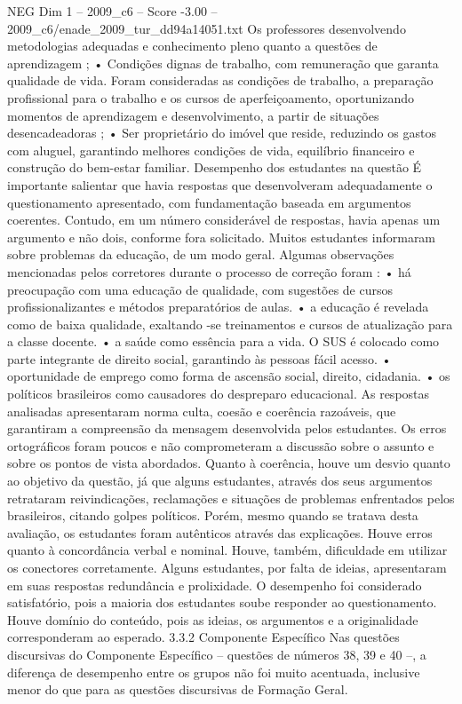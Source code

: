 \begin{textsample}{NEG Dim 1 – 2009\_c6 – Score -3.00 – 2009\_c6/enade\_2009\_tur\_dd94a14051.txt}
Os professores desenvolvendo metodologias adequadas e conhecimento pleno quanto a questões de aprendizagem ; • Condições dignas de trabalho, com remuneração que garanta qualidade de vida.
Foram consideradas as condições de trabalho, a preparação profissional para o trabalho e os cursos de aperfeiçoamento, oportunizando momentos de aprendizagem e desenvolvimento, a partir de situações desencadeadoras ; • Ser proprietário do imóvel que reside, reduzindo os gastos com aluguel, garantindo melhores condições de vida, equilíbrio financeiro e construção do bem-estar familiar.
Desempenho dos estudantes na questão É importante salientar que havia respostas que desenvolveram adequadamente o questionamento apresentado, com fundamentação baseada em argumentos coerentes.
Contudo, em um número considerável de respostas, havia apenas um argumento e não dois, conforme fora solicitado.
Muitos estudantes informaram sobre problemas da educação, de um modo geral.
Algumas observações mencionadas pelos corretores durante o processo de correção foram : • há preocupação com uma educação de qualidade, com sugestões de cursos profissionalizantes e métodos preparatórios de aulas. • a educação é revelada como de baixa qualidade, exaltando -se treinamentos e cursos de atualização para a classe docente. • a saúde como essência para a vida.
O SUS é colocado como parte integrante de direito social, garantindo às pessoas fácil acesso. • oportunidade de emprego como forma de ascensão social, direito, cidadania. • os políticos brasileiros como causadores do despreparo educacional.
As respostas analisadas apresentaram norma culta, coesão e coerência razoáveis, que garantiram a compreensão da mensagem desenvolvida pelos estudantes.
Os erros ortográficos foram poucos e não comprometeram a discussão sobre o assunto e sobre os pontos de vista abordados.
Quanto à coerência, houve um desvio quanto ao objetivo da questão, já que alguns estudantes, através dos seus argumentos retrataram reivindicações, reclamações e situações de problemas enfrentados pelos brasileiros, citando golpes políticos.
Porém, mesmo quando se tratava desta avaliação, os estudantes foram autênticos através das explicações.
Houve erros quanto à concordância verbal e nominal.
Houve, também, dificuldade em utilizar os conectores corretamente.
Alguns estudantes, por falta de ideias, apresentaram em suas respostas redundância e prolixidade.
O desempenho foi considerado satisfatório, pois a maioria dos estudantes soube responder ao questionamento.
Houve domínio do conteúdo, pois as ideias, os argumentos e a originalidade corresponderam ao esperado. 3.3.2 Componente Específico Nas questões discursivas do Componente Específico – questões de números 38, 39 e 40 –, a diferença de desempenho entre os grupos não foi muito acentuada, inclusive menor do que para as questões discursivas de Formação Geral.

\end{textsample}

